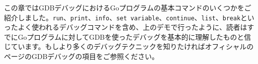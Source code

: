 この章ではGDBデバッグにおけるGoプログラムの基本コマンドのいくつかをご紹介しました。\texttt{run}、\texttt{print}、\texttt{info}、\texttt{set variable}、\texttt{continue}、\texttt{list}、\texttt{break}といったよく使われるデバッグコマンドを含め、上のデモで行ったように、読者はすでにGoプログラムに対してGDBを使ったデバッグを基本的に理解したものと信じています。もしより多くのデバッグテクニックを知りたければオフィシャルのページのGDBデバッグの項目をご参照ください。
